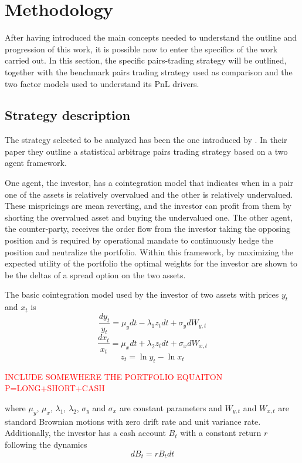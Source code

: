 \section{Methodology}
After having introduced the main concepts needed to understand the outline and progression of this work, it is possible now to enter the specifics of the work carried out. In this section, the specific pairs-trading strategy will be outlined, together with the benchmark pairs trading strategy used as comparison and the two factor models used to understand its PnL drivers.
\subsection{Strategy description}
The strategy selected to be analyzed has been the one introduced by \cite{ioannis_2023}. In their paper they outline a statistical arbitrage pairs trading strategy based on a two agent framework. 

One agent, the investor, has a cointegration model that indicates when in a pair one of the assets is relatively overvalued and the other is relatively undervalued. These mispricings are mean reverting, and the investor can profit from them by shorting the overvalued asset and buying the undervalued one. The other agent, the counter-party, receives the order flow from the investor taking the opposing position and is required by  operational mandate to continuously hedge the position and neutralize the portfolio. Within this framework, by maximizing the expected utility of the portfolio the optimal weights for the investor are shown to be the deltas of a spread option on the two assets. 

The basic cointegration model used by the investor of two assets with prices $y_t$ and $x_t$ is 
\begin{equation}
    \frac{dy_t}{y_t}=\mu_ydt-\lambda_1z_tdt+\sigma_ydW_{y,t}
\end{equation}
\begin{equation}
    \frac{dx_t}{x_t}=\mu_xdt+\lambda_2z_tdt+\sigma_xdW_{x,t}
\end{equation}
\begin{equation}
    z_t=\ln y_t - \ln x_t
\end{equation}

\textcolor{red}{INCLUDE SOMEWHERE THE PORTFOLIO EQUAITON P=LONG+SHORT+CASH}

where $\mu_y$, $\mu_x$, $\lambda_1$, $\lambda_2$, $\sigma_y$ and $\sigma_x$ are constant parameters and $W_{y,t}$ and $W_{x,t}$ are standard Brownian motions with zero drift rate and unit variance rate. Additionally, the investor has a cash account $B_t$
with a constant return $r$ following the dynamics
\begin{equation}
    dB_t=rB_tdt
\end{equation}


